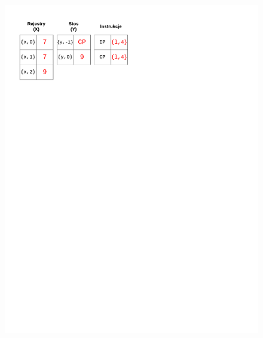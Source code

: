 \begin{figure}
\begin{multicols}{2}
\vspace{-4mm}
\begin{Figure}
 \centering
 \includegraphics[scale=0.65, clip, trim=0 215mm 110mm 0]{interpreter_max_5}
\label{fig:max5}
\end{Figure}


\end{multicols}
\end{figure}
